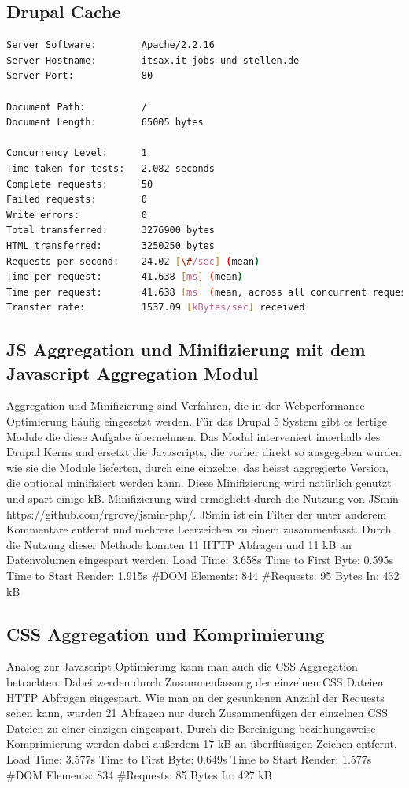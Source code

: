 \subsection{Drupal Cache}

\begin{lstlisting}[language=bash,label=Ausgabe von ab,caption=Ausgabe von ab]
Server Software:        Apache/2.2.16
Server Hostname:        itsax.it-jobs-und-stellen.de
Server Port:            80

Document Path:          /
Document Length:        65005 bytes

Concurrency Level:      1
Time taken for tests:   2.082 seconds
Complete requests:      50
Failed requests:        0
Write errors:           0
Total transferred:      3276900 bytes
HTML transferred:       3250250 bytes
Requests per second:    24.02 [\#/sec] (mean)
Time per request:       41.638 [ms] (mean)
Time per request:       41.638 [ms] (mean, across all concurrent requests)
Transfer rate:          1537.09 [kBytes/sec] received
\end{lstlisting}



\subsection{JS Aggregation und Minifizierung mit dem Javascript Aggregation Modul}
Aggregation und Minifizierung sind Verfahren, die in der Webperformance Optimierung häufig eingesetzt werden. Für das Drupal 5 System gibt es fertige Module die diese Aufgabe übernehmen. Das Modul interveniert innerhalb des Drupal Kerns und ersetzt die Javascripts, die vorher direkt so ausgegeben wurden wie sie die Module lieferten, durch eine einzelne, das heisst aggregierte Version, die optional minifiziert werden kann. Diese Minifizierung wird natürlich genutzt und spart einige kB. Minifizierung wird ermöglicht durch die Nutzung von JSmin https://github.com/rgrove/jsmin-php/. JSmin ist ein Filter der unter anderem Kommentare entfernt und mehrere Leerzeichen zu einem zusammenfasst. Durch die Nutzung dieser Methode konnten 11 HTTP Abfragen und 11 kB an Datenvolumen eingespart werden.
Load Time: 3.658s
Time to First Byte: 0.595s
Time to Start Render: 1.915s
\#DOM Elements: 844 	
\#Requests: 95 %
Bytes In: 432 kB

\subsection{CSS Aggregation und Komprimierung}
Analog zur Javascript Optimierung kann man auch die CSS Aggregation betrachten. Dabei werden durch Zusammenfassung der einzelnen CSS Dateien HTTP Abfragen eingespart. Wie man an der gesunkenen Anzahl der Requests sehen kann, wurden 21 Abfragen nur durch Zusammenfügen der einzelnen CSS Dateien zu einer einzigen eingespart. Durch die Bereinigung beziehungsweise Komprimierung werden dabei außerdem 17 kB an überflüssigen Zeichen entfernt. 
Load Time: 3.577s
Time to First Byte: 0.649s
Time to Start Render: 1.577s
\#DOM Elements: 834 	
\#Requests: 85 %
Bytes In: 427 kB
